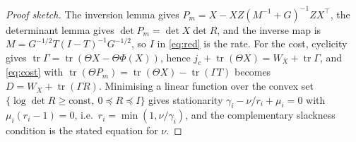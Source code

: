 \begin{proof}[Proof sketch]
The inversion lemma gives $P_m=X-XZ(M^{-1}+G)^{-1}ZX^{\top}$, the determinant
lemma gives $\det P_m=\det X\det R$, and the inverse map is
$M=G^{-1/2}T(I-T)^{-1}G^{-1/2}$, so $I$ in \eqref{eq:red} is the rate. For the
cost, cyclicity gives $\operatorname{tr}\Gamma=\operatorname{tr}(\Theta X-\Theta\Phi(X))$,
hence $j_c+\operatorname{tr}(\Theta X)=W_X+\operatorname{tr}\Gamma$, and
\eqref{eq:cost} with $\operatorname{tr}(\Theta P_m)=\operatorname{tr}(\Theta X)-
\operatorname{tr}(\Gamma T)$ becomes $D=W_X+\operatorname{tr}(\Gamma R)$.
Minimising a linear function over the convex set
$\{\log\det R\ge\text{const},\ 0\preceq R\preceq I\}$ gives stationarity
$\gamma_i-\nu/r_i+\mu_i=0$ with $\mu_i(r_i-1)=0$, i.e.\ $r_i=\min(1,\nu/\gamma_i)$,
and the complementary slackness condition is the stated equation for $\nu$.

\end{proof}


